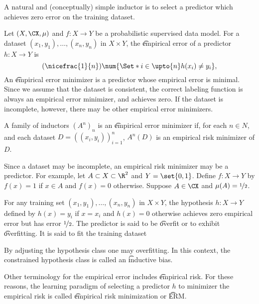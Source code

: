 

A natural and (conceptually) simple inductor is to select a predictor which achieves zero error on the training dataset.


Let $(X, \CX, \mu)$ and $f: X \to Y$ be a probabilistic supervised data model.
For a dataset $(x_1, y_1), \dots, (x_n, y_n)$ in $X \times Y$, the \t{empirical error} of a predictor $h: X \to Y$ is
\[
  (\nicefrac{1}{n})\num{\Set*{i \in \upto{n}}{h(x_i) \neq y_i}},
\]
An \t{empirical error minimizer} is a predictor whose empirical error is minimal.
Since we assume that the dataset is consistent, the correct labeling function is always an empirical error minimizer, and achieves zero.
If the dataset is incomplete, however, there may be other empirical error minimizers.

A family of inductors $(A^n)_n$ is an \t{empirical error minimizer} if, for each $n \in N$, and each dataset $D = ((x_i, y_i))_{i = 1}^{n}$, $A^n(D)$ is an empirical risk minimizer of $D$.


Since a dataset may be incomplete, an empirical risk minimizer may be a  predictor.
For example, let $A \subset X \subset \R^2$ and $Y = \set{0, 1}$.
Define $f: X \to Y$ by $f(x) = 1$ if $x \in A$ and $f(x) = 0$ otherwise.
Suppose $A \in \CX$ and $\mu(A) = \nicefrac{1}{2}$.

For any training set $(x_1, y_1), \dots, (x_n, y_n)$ in $X \times Y$, the hypothesis $h: X \to Y$ defined by $h(x) = y_i$ if $x = x_i$ and $h(x) = 0$ otherwise achieves zero empirical error but has  error $\nicefrac{1}{2}$.
The predictor is said to be \t{overfit} or to exhibit \t{overfitting}.
It is said to fit the training dataset 

By adjusting the hypothesis class one may  overfitting. 
In this context, the constrained hypothesis class is called an \t{inductive bias}.


Other terminology for the empirical error includes \t{empirical risk}.
For these reasons, the learning paradigm of selecting a predictor $h$ to minimizer the empirical risk is called \t{empirical risk minimization} or \t{ERM}.